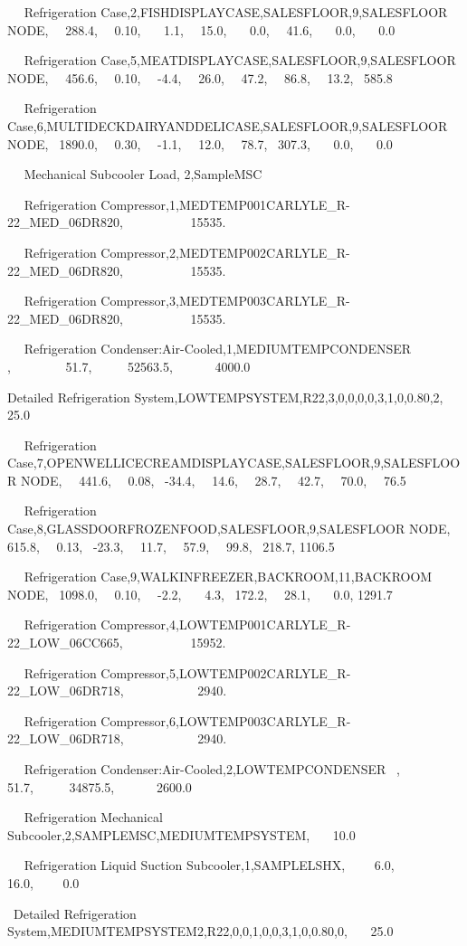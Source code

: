 ~~ Refrigeration Case,2,FISHDISPLAYCASE,SALESFLOOR,9,SALESFLOOR NODE,~~ 288.4,~~ 0.10,~~~ 1.1,~~ 15.0,~~~ 0.0,~~ 41.6,~~~ 0.0,~~~ 0.0

~~ Refrigeration Case,5,MEATDISPLAYCASE,SALESFLOOR,9,SALESFLOOR NODE,~~ 456.6,~~ 0.10,~~ -4.4,~~ 26.0,~~ 47.2,~~ 86.8,~~ 13.2,~ 585.8

~~ Refrigeration Case,6,MULTIDECKDAIRYANDDELICASE,SALESFLOOR,9,SALESFLOOR NODE,~ 1890.0,~~ 0.30,~~ -1.1,~~ 12.0,~~ 78.7,~ 307.3,~~~ 0.0,~~~ 0.0

~~ Mechanical Subcooler Load, 2,SampleMSC

~~ Refrigeration Compressor,1,MEDTEMP001CARLYLE\_R-22\_MED\_06DR820,~~~~~~~~~~ 15535.

~~ Refrigeration Compressor,2,MEDTEMP002CARLYLE\_R-22\_MED\_06DR820,~~~~~~~~~~ 15535.

~~ Refrigeration Compressor,3,MEDTEMP003CARLYLE\_R-22\_MED\_06DR820,~~~~~~~~~~ 15535.

~~ Refrigeration Condenser:Air-Cooled,1,MEDIUMTEMPCONDENSER~ ,~~~~~~~~ 51.7,~~~~~ 52563.5,~~~~~~ 4000.0

Detailed Refrigeration System,LOWTEMPSYSTEM,R22,3,0,0,0,0,3,1,0,0.80,2,~~~ 25.0

~~ Refrigeration Case,7,OPENWELLICECREAMDISPLAYCASE,SALESFLOOR,9,SALESFLOOR NODE,~~ 441.6,~~ 0.08,~ -34.4,~~ 14.6,~~ 28.7,~~ 42.7,~~ 70.0,~~ 76.5

~~ Refrigeration Case,8,GLASSDOORFROZENFOOD,SALESFLOOR,9,SALESFLOOR NODE,~~ 615.8,~~ 0.13,~ -23.3,~~ 11.7,~~ 57.9,~~ 99.8,~ 218.7, 1106.5

~~ Refrigeration Case,9,WALKINFREEZER,BACKROOM,11,BACKROOM NODE,~ 1098.0,~~ 0.10,~~ -2.2,~~~ 4.3,~ 172.2,~~ 28.1,~~~ 0.0, 1291.7

~~ Refrigeration Compressor,4,LOWTEMP001CARLYLE\_R-22\_LOW\_06CC665,~~~~~~~~~~ 15952.

~~ Refrigeration Compressor,5,LOWTEMP002CARLYLE\_R-22\_LOW\_06DR718,~~~~~~~~~~~ 2940.

~~ Refrigeration Compressor,6,LOWTEMP003CARLYLE\_R-22\_LOW\_06DR718,~~~~~~~~~~~ 2940.

~~ Refrigeration Condenser:Air-Cooled,2,LOWTEMPCONDENSER~ ,~~~~~~~~ 51.7,~~~~~ 34875.5,~~~~~~ 2600.0

~~ Refrigeration Mechanical Subcooler,2,SAMPLEMSC,MEDIUMTEMPSYSTEM,~~~ 10.0

~~ Refrigeration Liquid Suction Subcooler,1,SAMPLELSHX,~~~~ 6.0,~~~ 16.0,~~~~ 0.0

~Detailed Refrigeration System,MEDIUMTEMPSYSTEM2,R22,0,0,1,0,0,3,1,0,0.80,0,~~~ 25.0

